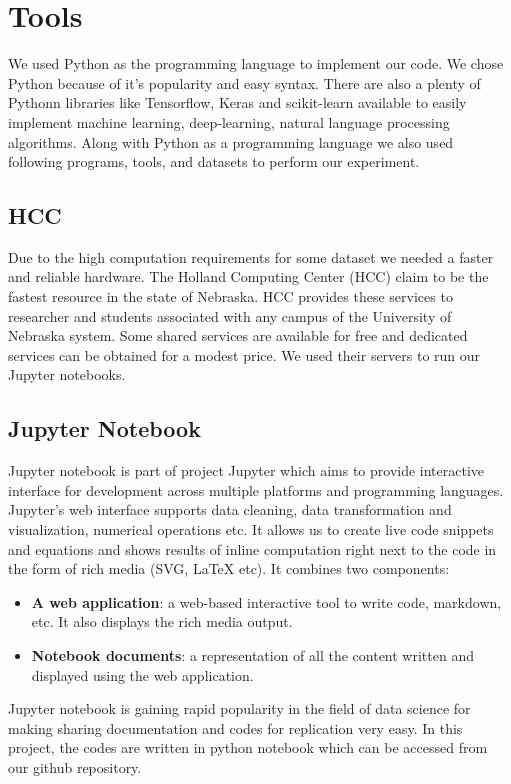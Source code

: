  \section{Tools}
We used Python as the programming language to implement our code. We chose Python because of it's popularity and easy syntax. There are also a plenty of Pythonn libraries like Tensorflow, Keras and scikit-learn available to easily implement machine learning, deep-learning, natural language processing algorithms. Along with Python as a programming language we also used following programs, tools, and datasets to perform our experiment.
\subsection{HCC}
Due to the high computation requirements for some dataset we needed a faster and reliable hardware. The Holland Computing Center (HCC) claim to be the fastest resource in the state of Nebraska. HCC provides these services to researcher and students associated with any campus of the University of Nebraska system. Some shared services are available for free and dedicated services can be obtained for a modest price. We used their servers to run our Jupyter notebooks.

\subsection{Jupyter Notebook}
Jupyter notebook is part of project Jupyter which aims to provide interactive interface for development across multiple platforms and programming languages. Jupyter's web interface supports data cleaning, data transformation and visualization, numerical operations etc. It allows us to create live code snippets and equations and shows results of inline computation right next to the code in the form of rich media (SVG, LaTeX etc). It combines two components: 
\begin{itemize}
  \item \textbf{A web application}: a web-based interactive tool to write code, markdown, etc. It also displays the rich media output.
  \item \textbf{Notebook documents}: a representation of all the content written and displayed using the web application.
\end{itemize}
Jupyter notebook is gaining rapid popularity in the field of data science for making sharing documentation and codes for replication very easy. In this project, the codes are written in python notebook which can be accessed from our github repository.

